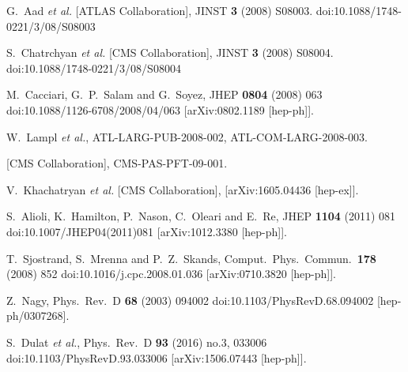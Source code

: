 \documentclass{PoS}
\begin{document}
\begin{thebibliography}{99}

  G.~Aad {\it et al.} [ATLAS Collaboration],
  JINST {\bf 3} (2008) S08003.
  doi:10.1088/1748-0221/3/08/S08003

  S.~Chatrchyan {\it et al.} [CMS Collaboration],
  JINST {\bf 3} (2008) S08004.
  doi:10.1088/1748-0221/3/08/S08004

  M.~Cacciari, G.~P.~Salam and G.~Soyez,
  JHEP {\bf 0804} (2008) 063
  doi:10.1088/1126-6708/2008/04/063
  [arXiv:0802.1189 [hep-ph]].

  W.~Lampl {\it et al.}, 
  ATL-LARG-PUB-2008-002, ATL-COM-LARG-2008-003.

  [CMS Collaboration],
  CMS-PAS-PFT-09-001.

  V.~Khachatryan {\it et al.} [CMS Collaboration], 
  [arXiv:1605.04436 [hep-ex]]. 

  S.~Alioli, K.~Hamilton, P.~Nason, C.~Oleari and E.~Re,
  JHEP {\bf 1104} (2011) 081
  doi:10.1007/JHEP04(2011)081
  [arXiv:1012.3380 [hep-ph]].

  T.~Sjostrand, S.~Mrenna and P.~Z.~Skands,
  Comput.\ Phys.\ Commun.\  {\bf 178} (2008) 852
  doi:10.1016/j.cpc.2008.01.036
  [arXiv:0710.3820 [hep-ph]].

  Z.~Nagy,
  Phys.\ Rev.\ D {\bf 68} (2003) 094002
  doi:10.1103/PhysRevD.68.094002
  [hep-ph/0307268].

  S.~Dulat {\it et al.},
  Phys.\ Rev.\ D {\bf 93} (2016) no.3,  033006
  doi:10.1103/PhysRevD.93.033006
  [arXiv:1506.07443 [hep-ph]].


\end{thebibliography}
\end{document}
